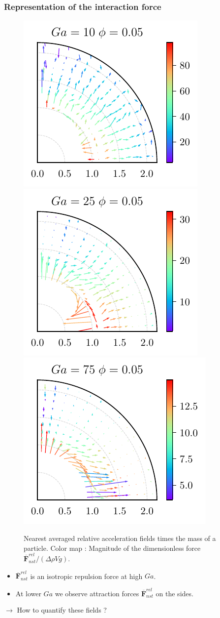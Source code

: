 \documentclass{sintefbeamer}
\newcommand{\nstrelavg}[1]{\overline{#1}_{nst}^{rel}}
\begin{document}
\begin{frame}
  \frametitle{Representation of the interaction force}

  \begin{figure}
    \includegraphics[height=0.25\textwidth]{image/HOMOGENEOUS/fDrop/F_mu_r_0_1_Ga_10_PHI_0_05.pdf}
    \includegraphics[height=0.25\textwidth]{image/HOMOGENEOUS/fDrop/F_mu_r_0_1_Ga_25_PHI_0_05.pdf}
    \includegraphics[height=0.25\textwidth]{image/HOMOGENEOUS/fDrop/F_mu_r_0_1_Ga_75_PHI_0_05.pdf}
    
    \caption{Nearest averaged relative acceleration fields times the mass of a particle. 
    Color map : Magnitude of the dimensionless force  $\nstrelavg{\textbf{F}} / (\Delta \rho V g)$.}
  \end{figure}

  
\begin{itemize}
  \item $\nstrelavg{\textbf{F}}$ is an isotropic repulsion force at high $Ga$. 
  \item At lower $Ga$ we observe attraction forces $\nstrelavg{\textbf{F}}$ on the sides.
\end{itemize}
$\rightarrow$ How to quantify these fields ? 
\end{frame}
\end{document}
